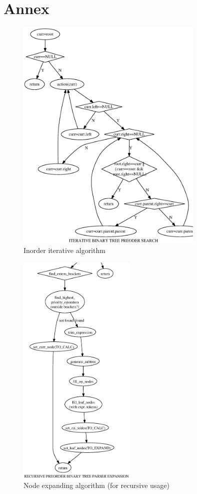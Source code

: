 \section{Annex}\label{Annex}
\begin{figure}[htb]
 \centering
 \includegraphics[width=0.8\textwidth]{pics/img003}
 \caption{Inorder iterative algorithm}
 \label{fig:05:001:Inorder_iterative}
\end{figure}

\begin{figure}[htb]
 \centering
 \includegraphics[width=0.5\textwidth]{pics/img004}
 \caption{Node expanding algorithm (for recursive usage)}
 \label{fig:05:004:Node Expanding}
\end{figure}


